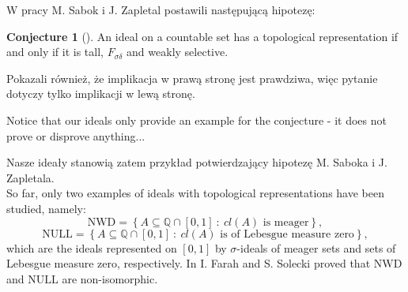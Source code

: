 \documentclass{amsart}
\newtheorem{thm}{Theorem}
\newtheorem{cor}{Corollary}
\theoremstyle{definition}
\theoremstyle{definition}
\newtheorem{conj}{Conjecture}
\newcommand{\I}{\mathcal I}
\begin{document}
W pracy \cite{Sabok} M. Sabok i J. Zapletal postawili następującą hipotezę:
\begin{conj}[\cite{Sabok}]
An ideal on a countable set has a topological representation if and only if it is tall, $F_{\sigma\delta}$ and weakly selective. 
\end{conj}


Pokazali również, że implikacja w prawą stronę jest prawdziwa, więc pytanie dotyczy tylko implikacji w lewą stronę.


\color{purple}
Notice that our ideals only provide an example for the conjecture - it does not prove or disprove anything... 
\color{black}

Nasze ideały stanowią zatem przykład potwierdzający hipotezę M. Saboka i J. Zapletala.\\









So far, only two examples of ideals with topological representations have been studied, namely:
$$\textrm{NWD}=\left\{A\subseteq\mathbb{Q}\cap [0,1]\ :\ cl(A) \textrm{ is meager}\right\},$$
$$\textrm{NULL}=\left\{A\subseteq\mathbb{Q}\cap [0,1]\ :\ cl(A) \textrm{ is of Lebesgue measure zero}\right\},$$
which are the ideals represented on $[0,1]$ by $\sigma$-ideals of meager sets and sets of Lebesgue measure zero, respectively. In \cite{FS} I. Farah and S. Solecki proved that $\textrm{NWD}$ and $\textrm{NULL}$ are non-isomorphic.
\end{document}
